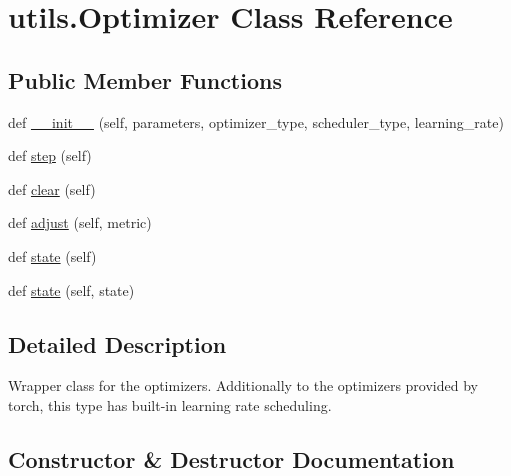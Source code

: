 \hypertarget{classutils_1_1Optimizer}{}\section{utils.\+Optimizer Class Reference}
\label{classutils_1_1Optimizer}
\subsection*{Public Member Functions}
\begin{DoxyCompactItemize}
\item 
def \hyperlink{classutils_1_1Optimizer_a9693d3a786237221b7a1dc00044026c6}{\+\_\+\+\_\+init\+\_\+\+\_\+} (self, parameters, optimizer\+\_\+type, scheduler\+\_\+type, learning\+\_\+rate)
\item 
def \hyperlink{classutils_1_1Optimizer_aa7dc63c97100388e23595095a5d77445}{step} (self)
\item 
def \hyperlink{classutils_1_1Optimizer_a8bd8dd05cc991c21b8700240858d0354}{clear} (self)
\item 
def \hyperlink{classutils_1_1Optimizer_a59eb009f0b2e04804497863266cc4dd4}{adjust} (self, metric)
\item 
def \hyperlink{classutils_1_1Optimizer_a21d5dad1145a246b6ff6c24730f09fc5}{state} (self)
\item 
def \hyperlink{classutils_1_1Optimizer_aa0ddbbf808474fd2f63bad79b69a9a4c}{state} (self, state)
\end{DoxyCompactItemize}


\subsection{Detailed Description}
\begin{DoxyVerb}Wrapper class for the optimizers. Additionally to the optimizers provided by torch,
this type has built-in learning rate scheduling.
\end{DoxyVerb}
 

\subsection{Constructor \& Destructor Documentation}
